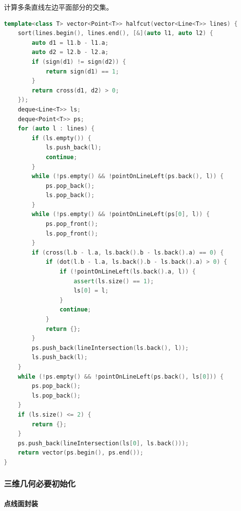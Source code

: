 计算多条直线左边平面部分的交集。

\begin{lstlisting}[language={C++}]
template<class T> vector<Point<T>> halfcut(vector<Line<T>> lines) {
    sort(lines.begin(), lines.end(), [&](auto l1, auto l2) {
        auto d1 = l1.b - l1.a;
        auto d2 = l2.b - l2.a;
        if (sign(d1) != sign(d2)) {
            return sign(d1) == 1;
        }
        return cross(d1, d2) > 0;
    });
    deque<Line<T>> ls;
    deque<Point<T>> ps;
    for (auto l : lines) {
        if (ls.empty()) {
            ls.push_back(l);
            continue;
        }
        while (!ps.empty() && !pointOnLineLeft(ps.back(), l)) {
            ps.pop_back();
            ls.pop_back();
        }
        while (!ps.empty() && !pointOnLineLeft(ps[0], l)) {
            ps.pop_front();
            ls.pop_front();
        }
        if (cross(l.b - l.a, ls.back().b - ls.back().a) == 0) {
            if (dot(l.b - l.a, ls.back().b - ls.back().a) > 0) {
                if (!pointOnLineLeft(ls.back().a, l)) {
                    assert(ls.size() == 1);
                    ls[0] = l;
                }
                continue;
            }
            return {};
        }
        ps.push_back(lineIntersection(ls.back(), l));
        ls.push_back(l);
    }
    while (!ps.empty() && !pointOnLineLeft(ps.back(), ls[0])) {
        ps.pop_back();
        ls.pop_back();
    }
    if (ls.size() <= 2) {
        return {};
    }
    ps.push_back(lineIntersection(ls[0], ls.back()));
    return vector(ps.begin(), ps.end());
}
\end{lstlisting}

\hypertarget{ux4e09ux7ef4ux51e0ux4f55ux5fc5ux8981ux521dux59cbux5316}{%
\subsubsection{三维几何必要初始化}\label{ux4e09ux7ef4ux51e0ux4f55ux5fc5ux8981ux521dux59cbux5316}}

\hypertarget{ux70b9ux7ebfux9762ux5c01ux88c5}{%
\paragraph{点线面封装}\label{ux70b9ux7ebfux9762ux5c01ux88c5}}


